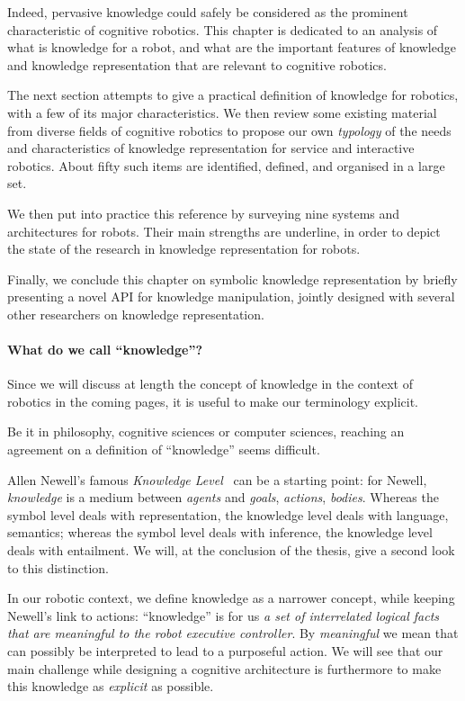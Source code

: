 Indeed, pervasive knowledge could safely be considered as the prominent
characteristic of cognitive robotics. This chapter is dedicated to an analysis
of what is knowledge for a robot, and what are the important features of
knowledge and knowledge representation that are relevant to cognitive robotics.

The next section attempts to give a practical definition of knowledge for
robotics, with a few of its major characteristics. We then review some existing
material from diverse fields of cognitive robotics to propose our own
\emph{typology} of the needs and characteristics of knowledge representation
for service and interactive robotics. About fifty such items are identified,
defined, and organised in a large set.

We then put into practice this reference by surveying nine systems and
architectures for robots. Their main strengths are underline, in order to
depict the state of the research in knowledge representation for robots.

Finally, we conclude this chapter on symbolic knowledge representation by
briefly presenting a novel API for knowledge manipulation, jointly designed
with several other researchers on knowledge representation.

\paragraph{What do we call ``knowledge''?}
\label{sect|on-knowledge}

Since we will discuss at length the concept of knowledge in the context of
robotics in the coming pages, it is useful to make our terminology explicit.

Be it in philosophy, cognitive sciences or computer sciences, reaching an
agreement on a definition of ``knowledge'' seems difficult.

Allen Newell's famous \emph{Knowledge Level}~\cite{Newell1981} can be a
starting point: for Newell, \emph{knowledge} is a medium between \emph{agents}
and \emph{goals}, \emph{actions}, \emph{bodies}. Whereas the symbol level deals
with representation, the knowledge level deals with language, semantics;
whereas the symbol level deals with inference, the knowledge level deals with
entailment. We will, at the conclusion of the thesis, give a second look to
this distinction.

In our robotic context, we define knowledge as a narrower concept, while
keeping Newell's link to actions: ``knowledge'' is for us  \emph{a set of
interrelated logical facts that are meaningful to the robot executive
controller}. By \emph{meaningful} we mean that can possibly be interpreted to
lead to a purposeful action. We will see that our main challenge while
designing a cognitive architecture is furthermore to make this knowledge as
\emph{explicit} as possible.

